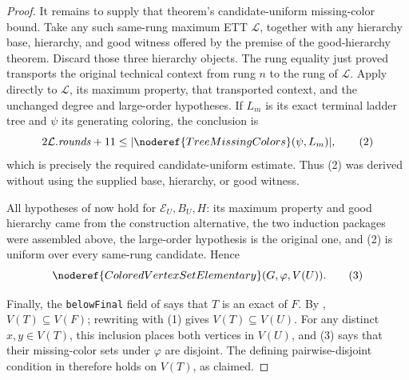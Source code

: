 \begin{proof}
It remains to supply that theorem's candidate-uniform missing-color bound.
Take any such same-rung maximum ETT \(\mathcal L\), together with any
hierarchy base, hierarchy, and good witness offered by the premise of the
good-hierarchy theorem.  Discard those three hierarchy objects.  The rung
equality just proved transports the original technical context from rung
\(n\) to the rung of \(\mathcal L\).  Apply
 directly to
\(\mathcal L\), its maximum property, that transported context, and the
unchanged degree and large-order hypotheses.  If \(L_m\) is its exact
terminal ladder tree and \(\psi\) its generating coloring, the conclusion is
\[
  2\mathcal L.\mathit{rounds}+11
       \leq |\noderef{TreeMissingColors}(\psi,L_m)|,             \tag{2}
\]
which is precisely the required candidate-uniform estimate.  Thus (2) was
derived without using the supplied base, hierarchy, or good witness.

All hypotheses of  now hold for
\(\mathcal E_U,B_U,H\): its maximum property and good hierarchy came from
the construction alternative, the two induction packages were assembled
above, the large-order hypothesis is the original one, and (2) is uniform
over every same-rung candidate.  Hence
\[
 \noderef{ColoredVertexSetElementary}(G,\varphi,V(U)).           \tag{3}
\]

Finally, the \texttt{belowFinal} field of
 says that \(T\) is an exact
 of \(F\).  By
,
\(V(T)\subseteq V(F)\); rewriting with (1) gives
\(V(T)\subseteq V(U)\).  For any distinct \(x,y\in V(T)\), this inclusion
places both vertices in \(V(U)\), and (3) says that their missing-color sets
under \(\varphi\) are disjoint.  The defining pairwise-disjoint condition in
 therefore holds on \(V(T)\), as
claimed.
\end{proof}
